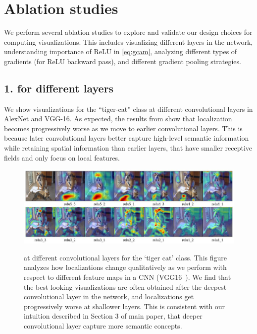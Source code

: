 

\vspace{-15pt}
\section{Ablation studies} \label{sec:ablation}

We perform several ablation studies to explore and validate our design choices for computing \gcam{} visualizations. 
This includes visualizing different layers in the network, understanding importance of ReLU in \eqref{eq:gcam}, analyzing different types of gradients (for ReLU backward pass), and different gradient pooling strategies.




\vspace{-8pt}
\subsection*{1. \gcam{} for different layers}

We show \gcam{} visualizations for the ``tiger-cat'' class at different convolutional
layers in AlexNet and VGG-16.
As expected, the results from  show that localization
becomes progressively worse as we move to earlier convolutional layers.
This is because later convolutional layers better capture high-level semantic information
while retaining spatial information than earlier layers, that have smaller
receptive fields and only focus on local features.

\begin{figure}[t!]
	\centering
    \includegraphics[width=1\textwidth]{figures/vgg16_conv_layers_new.jpg}\\
    \vspace{-5pt}
		\label{fig:vgg16conv}
        \vspace{5pt}
		\caption{ \gcam{} at different convolutional layers for the `tiger cat' class.
            This figure analyzes how localizations change qualitatively as we perform \gcam{} with respect to different feature maps in a CNN (VGG16~\cite{simonyan_arxiv14}).
	We find that the best looking visualizations are often obtained after the deepest convolutional layer in the network, and localizations get progressively worse at shallower layers.
This is consistent with our intuition described in Section 3 of main paper, that deeper convolutional layer capture more semantic concepts. %
}
	\label{fig:conv_layers}
\end{figure}

